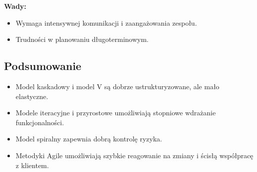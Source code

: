 \textbf{Wady:}
\begin{itemize}
    \item Wymaga intensywnej komunikacji i zaangażowania zespołu.
    \item Trudności w planowaniu długoterminowym.
\end{itemize}

\subsection{Podsumowanie}
\begin{itemize}
    \item Model kaskadowy i model V są dobrze ustrukturyzowane, ale mało elastyczne.
    \item Modele iteracyjne i przyrostowe umożliwiają stopniowe wdrażanie funkcjonalności.
    \item Model spiralny zapewnia dobrą kontrolę ryzyka.
    \item Metodyki Agile umożliwiają szybkie reagowanie na zmiany i ścisłą współpracę z klientem.
\end{itemize}
